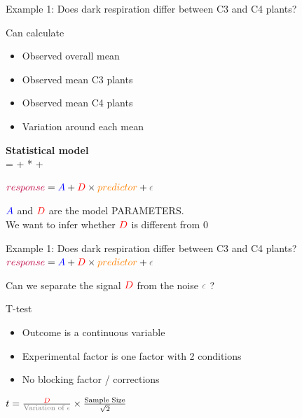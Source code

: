 \documentclass{beamer}
\begin{document}
\begin{frame}{Example 1: Does dark respiration differ between C3 and C4 plants?}

    \begin{block}{Can calculate}
 \begin{itemize}
  \item Observed overall mean
  \item Observed mean C3 plants
  \item Observed mean C4 plants
  \item Variation around each mean
 \end{itemize}
\end{block}

\textbf{Statistical model}\\
 {\color{purple}{Respiration}} = {\color{blue}{Mean for C3}} + {\color{red}{Difference C4-C3}} * {\color{orange}{(is C4?)}} + {\color{gray}{Noise}}\\
 \pause

${\color{purple}{response}} = {\color{blue}{A}} + {\color{red}{D}} \times {\color{orange}{predictor}} + {\color{gray}{\epsilon}}$

 ${\color{blue}{A}} $ and ${\color{red}{D}}$ are the model PARAMETERS. \\
 We want to infer whether ${\color{red}{D}}$ is different from 0

\end{frame}

\begin{frame}{Example 1: Does dark respiration differ between C3 and C4 plants?}
${\color{purple}{response}} = {\color{blue}{A}} + {\color{red}{D}} \times {\color{orange}{predictor}} + {\color{gray}{\epsilon}}$

  Can we separate the signal ${\color{red}{D}}$ from the noise ${\color{gray}{\epsilon}}$ ?

 \pause
 
 \begin{block}{T-test}
  \begin{itemize}
   \item Outcome is a continuous variable
   \item Experimental factor is one factor with 2 conditions
   \item No blocking factor / corrections
  \end{itemize}
 \end{block}
 
 \pause
 
 $ t = \frac{\color{red}{D}}{\text{\color{gray}{Variation of }}\color{gray}{\epsilon}} \times \frac{\text{Sample Size}}{\sqrt{2}}$

\end{frame}
\end{document}
